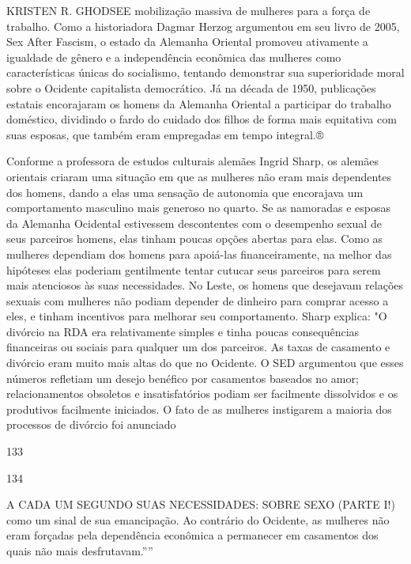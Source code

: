 \par 
KRISTEN R. GHODSEE mobilização massiva de mulheres para a força de trabalho. Como a historiadora Dagmar Herzog argumentou em seu livro de 2005, Sex After Fascism, o estado da Alemanha Oriental promoveu ativamente a igualdade de gênero e a independência econômica das mulheres como características únicas do socialismo, tentando demonstrar sua superioridade moral sobre o Ocidente capitalista democrático. Já na década de 1950, publicações estatais encorajaram os homens da Alemanha Oriental a participar do trabalho doméstico, dividindo o fardo do cuidado dos filhos de forma mais equitativa com suas esposas, que também eram empregadas em tempo integral.®
 \par 
Conforme a professora de estudos culturais alemães Ingrid Sharp, os alemães orientais criaram uma situação em que as mulheres não eram mais dependentes dos homens, dando a elas uma sensação de autonomia que encorajava um comportamento masculino mais generoso no quarto. Se as namoradas e esposas da Alemanha Ocidental estivessem descontentes com o desempenho sexual de seus parceiros homens, elas tinham poucas opções abertas para elas. Como as mulheres dependiam dos homens para apoiá-las financeiramente, na melhor das hipóteses elas poderiam gentilmente tentar cutucar seus parceiros para serem mais atenciosos às suas necessidades. No Leste, os homens que desejavam relações sexuais com mulheres não podiam depender de dinheiro para comprar acesso a eles, e tinham incentivos para melhorar seu comportamento. Sharp explica: "O divórcio na RDA era relativamente simples e tinha poucas consequências financeiras ou sociais para qualquer um dos parceiros. As taxas de casamento e divórcio eram muito mais altas do que no Ocidente. O SED argumentou que esses números refletiam um desejo benéfico por casamentos baseados no amor; relacionamentos obsoletos e insatisfatórios podiam ser facilmente dissolvidos e os produtivos facilmente iniciados. O fato de as mulheres instigarem a maioria dos processos de divórcio foi anunciado
 \par 
133
 \par 
134
 \par 
A CADA UM SEGUNDO SUAS NECESSIDADES: SOBRE SEXO (PARTE I!) como um sinal de sua emancipação. Ao contrário do Ocidente, as mulheres não eram forçadas pela dependência econômica a permanecer em casamentos dos quais não mais desfrutavam.””
 \par 
